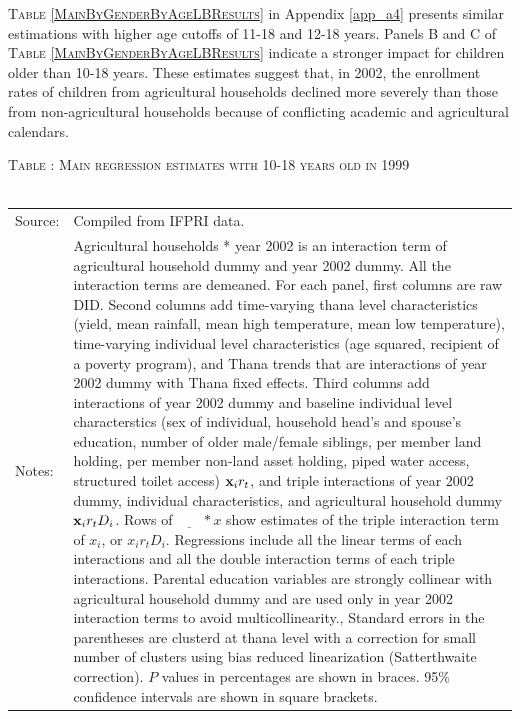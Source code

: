 \documentclass[12pt,letterpaper]{article}\usepackage[margin=1in]{geometry}
\newcommand{\bfx}{\ensuremath{\mbox{\bf x}}}
\newcommand{\0}{\ensuremath{\mbox{\boldmath $0$}}}
\begin{document}
\textsc{\small Table \ref{MainByGenderByAgeLBResults}} in Appendix \ref{app_a4} presents similar estimations with higher age cutoffs of 11-18 and 12-18 years. Panels B and C of \textsc{Table \ref{MainByGenderByAgeLBResults}} indicate a stronger impact for children older than 10-18 years. These estimates suggest that, in 2002, the enrollment rates of children from agricultural households declined more severely than those from non-agricultural households because of conflicting academic and agricultural calendars.


\begin{table}\hfil\textsc{\footnotesize Table \thetable: Main regression estimates with 10-18 years old in 1999\label{base10}}\\\setlength{\tabcolsep}{.5pt}\renewcommand{\arraystretch}{.675}\hspace{-2em}\hfil\\
\renewcommand{\arraystretch}{1}\hfil\begin{tabular}{>{\hfill\scriptsize}p{1cm}<{}>{\scriptsize}p{12cm}<{\hfill}} Source:& Compiled from IFPRI data. \\[-1ex] 
Notes:&  \textsf{Agricultural households * year 2002} is an interaction term of agricultural household dummy and year 2002 dummy. All the interaction terms are demeaned. For each panel, first columns are raw DID. Second columns add time-varying thana level characteristics (yield, mean rainfall, mean high temperature, mean low temperature), time-varying individual level characteristics (age squared, recipient of a poverty program), and \textsf{Thana trends} that are interactions of year 2002 dummy with Thana fixed effects. Third columns add interactions of year 2002 dummy and baseline individual level characterstics (sex of individual, household head's and spouse's education, number of older male/female siblings, per member land holding, per member non-land asset holding, piped water access, structured toilet access) $\bfx_{i}r_{t}$, and triple interactions of year 2002 dummy, individual characteristics, and agricultural household dummy $\bfx_{i}r_{t}D_{i}$.  Rows of $\underline{\phantom{mm}}*x$ show estimates of the triple interaction term of $x_{i}$, or $x_{i}r_{t}D_{i}$. Regressions include all the linear terms of each interactions and all the double interaction terms of each triple interactions. Parental education variables are strongly collinear with agricultural household dummy and are used only in year 2002 interaction terms to avoid multicollinearity.,  Standard errors in the parentheses are clusterd at thana level with a correction for small number of clusters using bias reduced linearization (Satterthwaite correction). $P$ values in percentages are shown in braces. 95\% confidence intervals are shown in square brackets.   
\end{tabular} \end{table}
\end{document}
